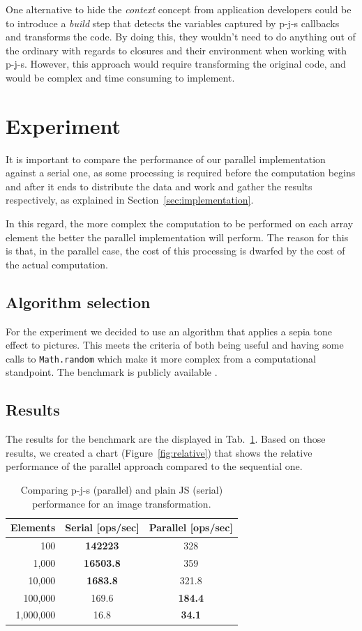 \documentclass[runningheads,a4paper]{llncs}
\begin{document}
One alternative to hide the \emph{context} concept from application developers could be to introduce a \textit{build} step that detects the variables captured by p-j-s callbacks and transforms the code. By doing this, they wouldn't need to do anything out of the ordinary with regards to closures and their environment when working with p-j-s. However, this approach would require transforming the original code, and would be complex and time consuming to implement.

\section{Experiment}\label{sec:experiment}
It is important to compare the performance of our parallel implementation against a serial one, as some processing is required before the computation begins and after it ends to distribute the data and work and gather the results respectively, as explained in Section~\ref{sec:implementation}.

In this regard, the more complex the computation to be performed on each array element the better the parallel implementation will perform. The reason for this is that, in the parallel case, the cost of this processing is dwarfed by the cost of the actual computation.

\subsection{Algorithm selection}
For the experiment we decided to use an algorithm that applies a sepia tone effect to pictures. This meets the criteria of both being useful and having some calls to \verb+Math.random+ which make it more complex from a computational standpoint. The benchmark is publicly available \cite{benchmark}.

\subsection{Results}
The results for the benchmark are the displayed in Tab.~\ref{tab:benchmark}. Based on those results, we created a chart (Figure~\ref{fig:relative}) that shows the relative performance of the parallel approach compared to the sequential one.
\begin{table}
  \centering
  \begin{tabular}{|r|c|c|}
    \hline
    Elements & Serial [ops/sec] & Parallel [ops/sec] \\
    \hline
    100 & \textbf{142223} & 328 \\
    1,000 & \textbf{16503.8} &  359 \\
    10,000 & \textbf{1683.8} & 321.8 \\
    100,000 & 169.6 & \textbf{184.4} \\
    1,000,000 & 16.8 & \textbf{34.1} \\
    \hline
  \end{tabular}
  \caption{Comparing p-j-s (parallel) and plain JS (serial) performance for an image transformation.}
  \label{tab:benchmark}
\end{table}
\end{document}
